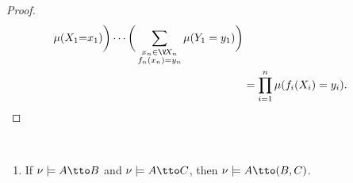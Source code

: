 \begin{subappendices}
\begin{proof}
\begin{align*}
                    \mu(X_1{=}x_1) \bigg) \cdots
                \bigg(\sum_{\substack{x_n \in \V\! X_n \\ f_n(x_n) = y_n}}
                    \mu(Y_1=y_1)\bigg) \\
            &= \prod_{i=1}^n \mu( f_i(X_i) = y_i ).
             \qedhere
    \end{align*}
\end{proof}


\begin{lemma}
        \label{lem:detprop}
    ~
    \begin{enumerate}
        \item 
        If $\nu \models A \tto B$ and $\nu \models A \tto C$, then $\nu \models A \tto (B,C)$. 


\end{enumerate}
\end{lemma}
\end{subappendices}
